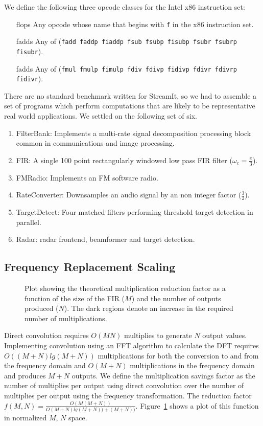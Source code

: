 We define the following three opcode classes for the Intel x86 instruction set:
\begin{itemize}
\item[flops] Any opcode whose name that begins with {\tt f} in the x86 instruction set.
\item[fadds] Any of ({\tt fadd faddp fiaddp fsub fsubp fisubp fsubr fsubrp fisubr}).
\item[fadds] Any of ({\tt fmul fmulp fimulp fdiv fdivp fidivp fdivr fdivrp fidivr}).
\end{itemize}

There are no standard benchmark written for StreamIt, so we had to assemble
a set of programs which perform computations that are likely to be representative
real world applications. We settled on the following set of six.

\begin{enumerate}
\item FilterBank: Implements a multi-rate signal decomposition processing block common in communications and image processing.
\item FIR: A single 100 point rectangularly windowed low pass FIR filter ($\omega_c=\frac{\pi}{3}$).
\item FMRadio: Implements an FM software radio.
\item RateConverter: Downsamples an audio signal by an non integer factor ($\frac{3}{2}$).
\item TargetDetect: Four matched filters performing threshold target detection in parallel.
\item Radar: radar frontend, beamformer and target detection.
\end{enumerate}


\subsection{Frequency Replacement Scaling}

\begin{figure}
\center
\epsfxsize=3.0in
\caption{Plot showing the theoretical multiplication reduction factor as a function of the size of the FIR ($M$) and the number of outputs produced ($N$). The dark regions denote an increase in the required number of multiplications.}
\label{fig:frequency-win-theory}
\vspace{-12pt}
\end{figure}

Direct convolution requires $O(MN)$ multiplies to generate $N$ output values. 
Implementing convolution using an FFT algorithm to calculate the DFT requires 
$O((M+N)lg(M+N))$ multiplications for both the conversion to and from the frequency domain
and $O(M+N)$ multiplications in the frequency domain and produces $M+N$ outputs.
We define the multiplication savings factor as the number of multiplies per output
using direct convolution over the number of multiplies per output using the 
frequency transformation. The reduction factor 
$f(M,N)=\frac{O(M(M+N))}{O(M+N)lg(M+N))+(M+N))}$. 
Figure~\ref{fig:frequency-win-theory} shows a plot of this function in normalized 
$M$, $N$ space. 

